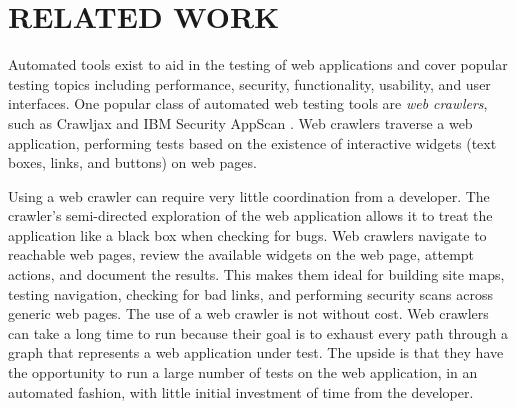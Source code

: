 %
%
%

\chapter{RELATED WORK}
\label{chap:related_work}

Automated tools exist to aid in the testing of web applications and cover
popular testing topics including performance, security, functionality,
usability, and user interfaces.  One popular class of automated web testing
tools are \textit{web crawlers}, such as Crawljax \cite{crawljax:tweb12} and
IBM Security AppScan \cite{Appscan:2013:Online}. Web crawlers traverse a web
application, performing tests based on the existence of interactive widgets
(text boxes, links, and buttons) on web pages.


Using a web crawler can require very little coordination from a developer.  The
crawler's semi-directed exploration of the web application allows it to treat
the application like a black box when checking for bugs. Web crawlers navigate
to reachable web pages, review the available widgets on the web page, attempt
actions, and document the results. This makes them ideal for building site
maps, testing navigation, checking for bad links, and performing security scans
across generic web pages. The use of a web crawler is not without cost.  Web
crawlers can take a long time to run because their goal is to exhaust every
path through a graph that represents a web application under test.  The upside
is that they have the opportunity to run a large number of tests on the web
application, in an automated fashion, with little initial investment of time
from the developer.

